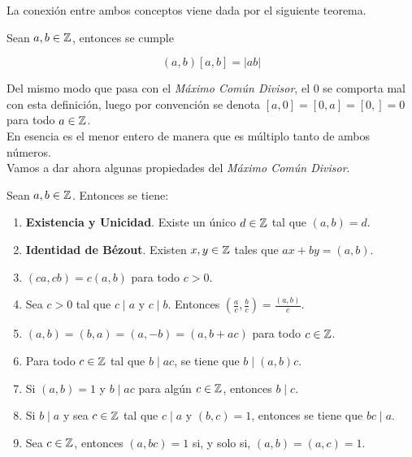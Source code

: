 La conexión entre ambos conceptos viene dada por el siguiente teorema.

\begin{teorema}\label{}
	Sean $a, b \in \mathbb{Z}$, entonces se cumple
	
	\begin{equation}
	(a, b)[a, b] = |ab|
	\end{equation}
\end{teorema}

Del mismo modo que pasa con el \textit{Máximo Común Divisor}, el $0$ se comporta mal con esta definición, luego por convención se denota $[a, 0] = [0, a] = [0, ] = 0$ para todo $a \in \mathbb{Z}$.\\

En esencia es el menor entero de manera que es múltiplo tanto de ambos números.\\

Vamos a dar ahora algunas propiedades del \textit{Máximo Común Divisor}.

\begin{proposicion}\label{propiedades_maximo_comun_divisor}
	Sean $a, b \in \mathbb{Z}$. Entonces se tiene:
	
	\begin{enumerate}
		\item \textbf{Existencia y Unicidad}. Existe un único $d \in \mathbb{Z}$ tal que $(a, b) = d$.
		
		\item \textbf{Identidad de Bézout}. Existen $x, y \in \mathbb{Z}$ tales que $ax + by = (a, b)$.
		
		\item $(ca, cb) = c(a, b)$ para todo $c > 0$.
		
		\item Sea $c > 0$ tal que $c \mid a$ y $c \mid b$. Entonces $\left(\frac{a}{c}, \frac{b}{c}\right) = \frac{(a, b)}{c}$.
		
		\item $(a, b) = (b, a) = (a, -b) = (a, b + ac)$ para todo $c \in \mathbb{Z}$.
		
		\item Para todo $c \in \mathbb{Z}$ tal que $b \mid ac$, se tiene que $b \mid (a, b)c$.
		
		\item Si $(a, b) = 1$ y $b \mid ac$ para algún $c \in \mathbb{Z}$, entonces $b \mid c$.
		
		\item Si $b \mid a$ y sea $c \in \mathbb{Z}$ tal que $c \mid a$ y $(b, c) = 1$, entonces se tiene que $bc \mid a$.
		
		\item Sea $c \in \mathbb{Z}$, entonces $(a, bc) = 1$ si, y solo si, $(a, b) = (a, c) = 1$.
	\end{enumerate}
\end{proposicion}


